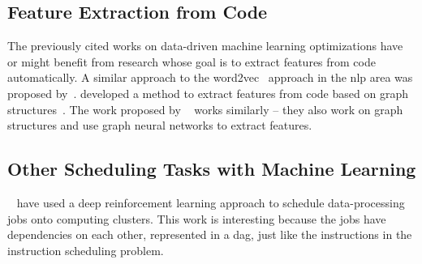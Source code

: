 \subsection{Feature Extraction from Code}
The previously cited works on data-driven machine learning optimizations have or might benefit from research whose goal is to extract features from code automatically.
A similar approach to the word2vec~\cite{mikolov2013efficient} approach in the \ac{nlp} area was proposed by~\cite{ben2018neural,alon2019code2vec}.
\citeauthor{cummins2021programl} developed a method to extract features from code based on graph structures~\cite{cummins2021programl}.
The work proposed by \citeauthor{brauckmann2020compiler}~\cite{brauckmann2020compiler} works similarly -- they also work on graph structures and use graph neural networks to extract features.

\subsection{Other Scheduling Tasks with Machine Learning}
\citeauthor{mao2019learning}~\cite{mao2019learning} have used a deep reinforcement learning approach to schedule data-processing jobs onto computing clusters.
This work is interesting because the jobs have dependencies on each other, represented in a \ac{dag}, just like the instructions in the instruction scheduling problem.






